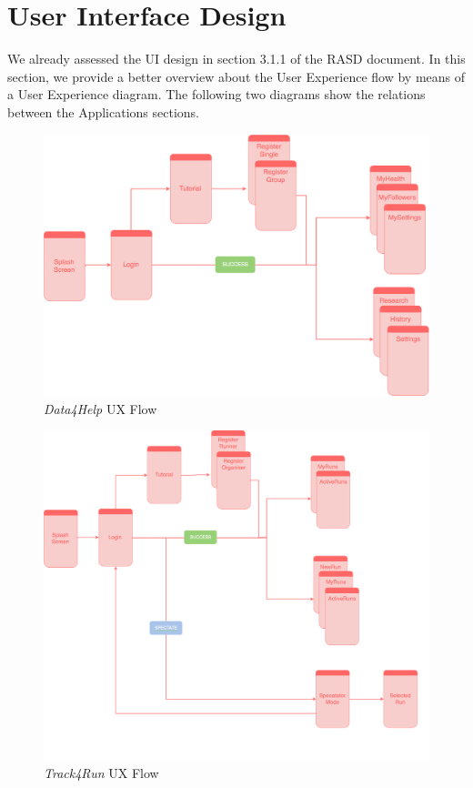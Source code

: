 \documentclass[titlepage]{article}
\begin{document}
	\section{User Interface Design}
	We already assessed the  UI design in section 3.1.1 of the RASD document. In this section, we provide a better overview about the User Experience flow by means of a User Experience diagram. The following two diagrams show the relations between the Application\textsc{}s sections.
	\begin{figure}[H]
		\center
		\includegraphics[width=14cm]{UXD4HDiagram.png}
		\caption{{\it Data4Help} UX Flow}
		\label{fig:D4HUX}
	\end{figure}
	\begin{figure}[H]
		\center
		\includegraphics[width=14cm]{UXT4RDiagram.png}
		\caption{{\it Track4Run} UX Flow}
		\label{fig:T4RUX}
	\end{figure}
	\pagebreak
	
\end{document}

